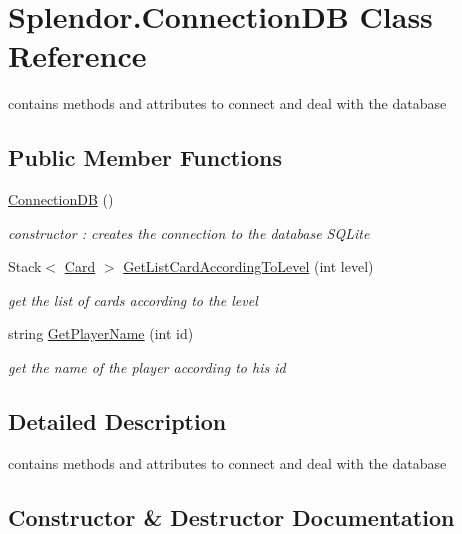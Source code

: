 \hypertarget{class_splendor_1_1_connection_d_b}{}\section{Splendor.\+Connection\+DB Class Reference}
\label{class_splendor_1_1_connection_d_b}


contains methods and attributes to connect and deal with the database  


\subsection*{Public Member Functions}
\begin{DoxyCompactItemize}
\item 
\mbox{\hyperlink{class_splendor_1_1_connection_d_b_aaaa5c66d4f12702d36a76dd21beb62c4}{Connection\+DB}} ()
\begin{DoxyCompactList}\small\item\em constructor \+: creates the connection to the database S\+Q\+Lite \end{DoxyCompactList}\item 
Stack$<$ \mbox{\hyperlink{class_splendor_1_1_card}{Card}} $>$ \mbox{\hyperlink{class_splendor_1_1_connection_d_b_abcd995d0fa97aa5f3a40ff5c23b22502}{Get\+List\+Card\+According\+To\+Level}} (int level)
\begin{DoxyCompactList}\small\item\em get the list of cards according to the level \end{DoxyCompactList}\item 
string \mbox{\hyperlink{class_splendor_1_1_connection_d_b_a7d715d5452049ad06f4a407fa5df151c}{Get\+Player\+Name}} (int id)
\begin{DoxyCompactList}\small\item\em get the name of the player according to his id \end{DoxyCompactList}\end{DoxyCompactItemize}


\subsection{Detailed Description}
contains methods and attributes to connect and deal with the database 



\subsection{Constructor \& Destructor Documentation}
\mbox{\label{class_splendor_1_1_connection_d_b_aaaa5c66d4f12702d36a76dd21beb62c4}} 
